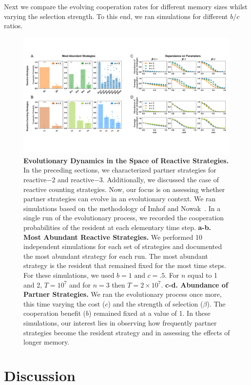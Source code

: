 \documentclass{article}
\theoremstyle{definition}
\begin{document}
Next we compare the evolving cooperation rates for different memory sizes whilst
varying the selection strength. To this end, we ran simulations for different
$b/c$ ratios.

\begin{figure}[htbp]
  \centering
  \includegraphics[width=\textwidth]{figures/evolutionary_results.pdf}
  \caption{\textbf{Evolutionary Dynamics in the Space of Reactive Strategies.}
  In the preceding sections, we characterized partner strategies for reactive$-2$
  and reactive$-3$. Additionally, we discussed the case of reactive counting
  strategies. Now, our focus is on assessing whether partner strategies can evolve
  in an evolutionary context. We ran simulations based on the methodology of Imhof
  and Nowak~\cite{imhof:royal:2010}. In a single run of the evolutionary process,
  we recorded the cooperation probabilities of the resident at each elementary
  time step.
  \textbf{a-b. Most Abundant Reactive Strategies.} We performed 10 independent
  simulations for each set of strategies and documented the most abundant strategy
  for each run. The most abundant strategy is the resident that remained fixed for
  the most time steps. For these simulations, we used \(b=1 \text{ and } c=.5\).
  For $n$ equal to 1 and 2, \(T= 10 ^ 7\) and for $n=3$ then \(T= 2 \times10 ^
  7\).
  \textbf{c-d. Abundance of Partner Strategies.}
  We ran the evolutionary process once more, this time varying the cost ($c$) and
  the strength of selection ($\beta$). The cooperation benefit ($b$) remained
  fixed at a value of 1. In these simulations, our interest lies in observing how
  frequently partner strategies become the resident strategy and in assessing the
  effects of longer memory.}\label{fig:evolutionary_results}
\end{figure}


\section{Discussion}
\end{document}
